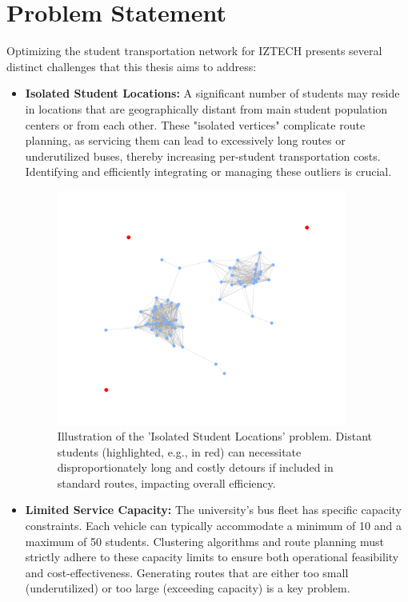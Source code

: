 \section{Problem Statement}
\label{sec:intro_problems}
Optimizing the student transportation network for IZTECH presents several distinct challenges that this thesis aims to address:

\begin{itemize}
    \item \textbf{Isolated Student Locations:} A significant number of students may reside in locations that are geographically distant from main student population centers or from each other. These "isolated vertices" complicate route planning, as servicing them can lead to excessively long routes or underutilized buses, thereby increasing per-student transportation costs. Identifying and efficiently integrating or managing these outliers is crucial.
    \begin{figure}[!htbp]
        \centering
        \includegraphics[width=0.9\textwidth]{img/robustness_problem.png}
        \caption{Illustration of the 'Isolated Student Locations' problem. Distant students (highlighted, e.g., in red) can necessitate disproportionately long and costly detours if included in standard routes, impacting overall efficiency.}
        \label{fig:problem_isolated_students}
    \end{figure}

    \item \textbf{Limited Service Capacity:} The university's bus fleet has specific capacity constraints. Each vehicle can typically accommodate a minimum of 10 and a maximum of 50 students. Clustering algorithms and route planning must strictly adhere to these capacity limits to ensure both operational feasibility and cost-effectiveness. Generating routes that are either too small (underutilized) or too large (exceeding capacity) is a key problem.


\end{itemize}
